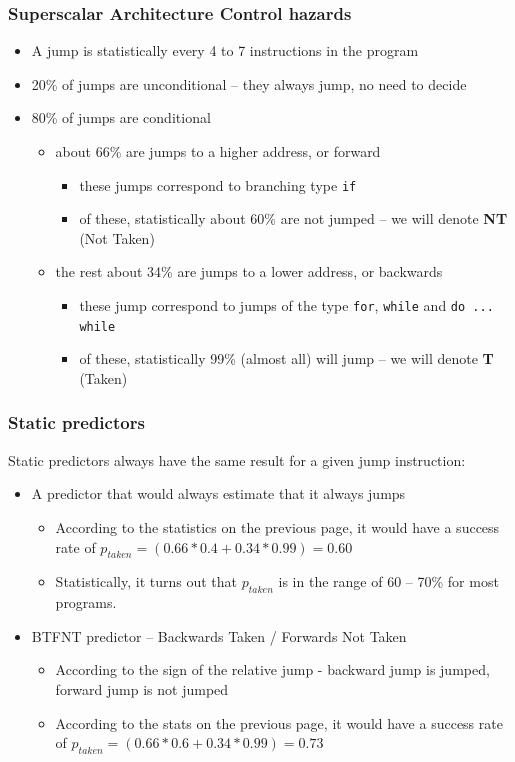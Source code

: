 \documentclass{beamer}
\begin{document}
\begin{frame}
\frametitle{Superscalar Architecture Control hazards}

\begin{itemize}
\item A jump is statistically every 4 to 7 instructions in the program
\item 20\% of jumps are unconditional -- they always jump, no need to decide
\item 80\% of jumps are conditional
  \begin{itemize}
  \item about 66\% are jumps to a higher address, or forward
    \begin{itemize}
    \item these jumps correspond to branching type \texttt{if}
    \item of these, statistically about 60\% are not jumped -- we will denote \textbf{NT} (Not Taken)
    \end{itemize}
  \item the rest about 34\% are jumps to a lower address, or backwards
    \begin{itemize}
    \item these jump correspond to jumps of the type \texttt{for}, \texttt{while} and \texttt{do ... while}
    \item of these, statistically 99\% (almost all) will jump -- we will denote \textbf{T} (Taken)
    \end{itemize}
  \end{itemize}
\end{itemize}

\end{frame}


\begin{frame}
\frametitle{Static predictors}

Static predictors always have the same result for a given jump instruction:
\begin{itemize}
\item A predictor that would always estimate that it always jumps
\begin{itemize}
\item According to the statistics on the previous page, it would have a success rate of $p_{taken} = (0.66*0.4+0.34*0.99) = 0.60$
\item Statistically, it turns out that $p_{taken}$ is in the range of 60 -- 70\% for most programs.
\end{itemize}
\item BTFNT predictor -- Backwards Taken / Forwards Not Taken
\begin{itemize}
\item According to the sign of the relative jump - backward jump is jumped, forward jump is not jumped
\item According to the stats on the previous page, it would have a success rate of $p_{taken} = (0.66*0.6+0.34*0.99) = 0.73$
\end{itemize}
\end{itemize}

\end{frame}
\end{document}
